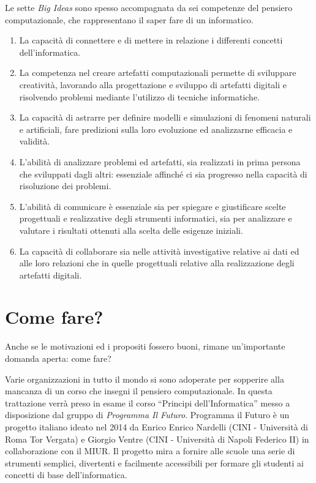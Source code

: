 \documentclass[11pt,a4paper]{article}
\begin{document}
Le sette \emph{Big Ideas} sono spesso accompagnata da sei competenze
del pensiero computazionale, che rappresentano il saper fare di un
informatico.

\begin{enumerate}
    \item La capacità di connettere e di mettere in relazione i
      differenti concetti dell'informatica.
    \item La competenza nel creare artefatti computazionali permette
      di sviluppare creatività, lavorando alla progettazione e
      sviluppo di artefatti digitali e risolvendo problemi mediante
      l'utilizzo di tecniche informatiche.
    \item La capacità di astrarre per definire modelli e simulazioni
      di fenomeni naturali e artificiali, fare predizioni sulla loro
      evoluzione ed analizzarne efficacia e validità.
    \item L'abilità di analizzare problemi ed artefatti, sia
      realizzati in prima persona che sviluppati dagli altri:
      essenziale affinché ci sia progresso nella capacità di
      risoluzione dei problemi.
    \item L'abilità di comunicare è essenziale sia per spiegare e
      giustificare scelte progettuali e realizzative degli strumenti
      informatici, sia per analizzare e valutare i risultati ottenuti
      alla scelta delle esigenze iniziali.
    \item La capacità di collaborare sia nelle attività investigative
      relative ai dati ed alle loro relazioni che in quelle
      progettuali relative alla realizzazione degli artefatti
      digitali.
\end{enumerate}

\section{Come fare?}

Anche se le motivazioni ed i propositi fossero buoni, rimane
un'importante domanda aperta: come fare?

Varie organizzazioni in tutto il mondo si sono adoperate per sopperire
alla mancanza di un corso che insegni il pensiero computazionale. In
questa trattazione verrà preso in esame il corso ``Principi
dell'Informatica'' messo a disposizione dal gruppo di \emph{Programma
  Il Futuro}. Programma il Futuro è un progetto italiano ideato nel
2014 da Enrico Enrico Nardelli (CINI - Università di Roma Tor Vergata)
e Giorgio Ventre (CINI - Università di Napoli Federico II) in
collaborazione con il MIUR. Il progetto mira a fornire alle scuole una
serie di strumenti semplici, divertenti e facilmente accessibili per
formare gli studenti ai concetti di base dell'informatica.
\end{document}
